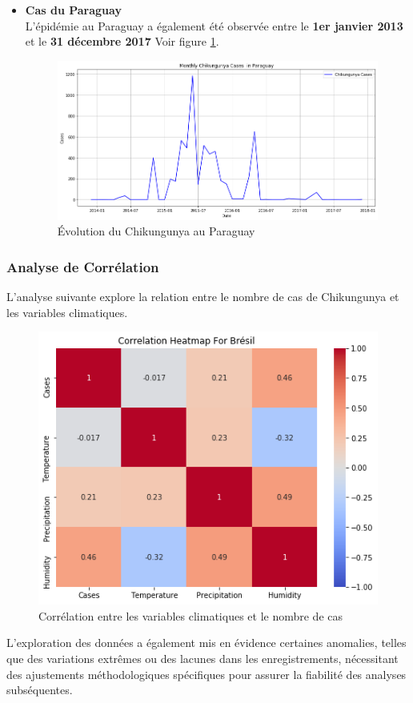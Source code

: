 \begin{itemize}
	\item \textbf{Cas du Paraguay}\\
	L'épidémie au Paraguay a également été observée entre le \textbf{1er janvier 2013} et le \textbf{31 décembre 2017} Voir figure \ref{fig:caseparaguay}.
	\begin{figure}[h!]
		\centering
		\includegraphics[width=0.9\linewidth]{images/case_paraguay}
		\caption[Évolution du Chikungunya au Paraguay]{Évolution du Chikungunya au Paraguay}
		\label{fig:caseparaguay}
	\end{figure}
\end{itemize}

\subsubsection*{Analyse de Corrélation}
L'analyse suivante explore la relation entre le nombre de cas de Chikungunya et les variables climatiques. 
\begin{figure}[h!]
	\centering
	\includegraphics[width=0.5\linewidth]{images/case_correlation}
	\caption[Corrélation entre les variables climatiques et le nombre de cas]{Corrélation entre les variables climatiques et le nombre de cas}
	\label{fig:casecorrelation}
\end{figure}

L'exploration des données a également mis en évidence certaines anomalies, telles que des variations extrêmes ou des lacunes dans les enregistrements, nécessitant des ajustements méthodologiques spécifiques pour assurer la fiabilité des analyses subséquentes.


